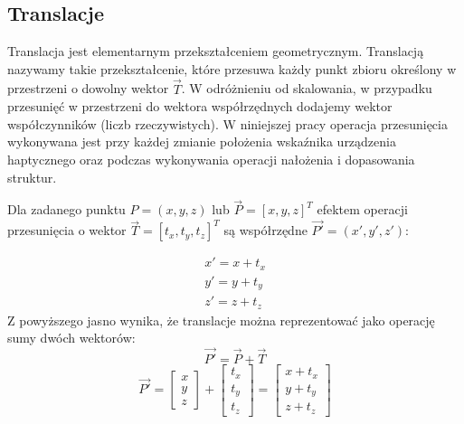 \documentclass[licencjacka]{pracamgr}
\begin{document}
\subsection{Translacje}
Translacja jest elementarnym przekształceniem geometrycznym. Translacją nazywamy takie przekształcenie, które przesuwa każdy punkt zbioru określony w przestrzeni o dowolny wektor $\vec{T}$. W odróżnieniu od skalowania, w przypadku przesunięć w przestrzeni do wektora współrzędnych dodajemy wektor współczynników (liczb rzeczywistych). W niniejszej pracy operacja przesunięcia wykonywana jest przy każdej zmianie położenia wskaźnika urządzenia haptycznego oraz podczas wykonywania operacji nałożenia i dopasowania struktur. 

Dla zadanego punktu $P=(x,y,z)$ lub $\vec{P}=[x,y,z]^T$ efektem operacji przesunięcia o wektor $\vec{T}=[t_x, t_y, t_z]^T$ są współrzędne $\vec{P'}=(x',y',z')$:

$$
\begin{array}{lr}
x'=x+t_x \\
y'=y+t_y \\
z'=z+t_z
\end{array}
$$
Z powyższego jasno wynika, że translacje można reprezentować jako operację sumy dwóch wektorów:
$$
\vec{P'}=\vec{P}+\vec{T}
$$
$$
\vec{P'}
=
\begin{bmatrix}
x \\
y \\
z
\end{bmatrix}
+
\begin{bmatrix}
t_x \\
t_y \\
t_z 
\end{bmatrix}
=
\begin{bmatrix}
x+t_x \\
y+t_y \\
z+t_z 
\end{bmatrix}
$$
\end{document}
